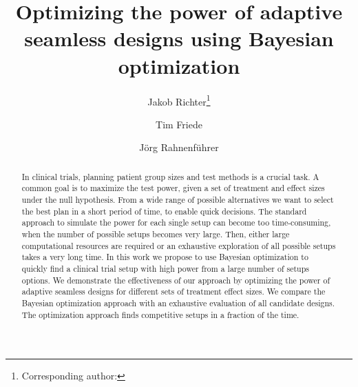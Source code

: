 \documentclass[bimj,fleqn]{w-art}
\theoremstyle{plain}
\theoremstyle{definition}
\begin{document}

\title[Bayesian optimization of Adaptive Seamless Designs]{Optimizing the power of adaptive seamless designs using Bayesian optimization} %
\author[Jakob Richter {\it{et al.}}]{Jakob Richter\footnote{Corresponding author: {}}} 
\address[\inst{1}]{Fakultät Statistik, Technische Universität Dortmund, 44221 Dortmund}
\author[dd]{Tim Friede}
\address[\inst{2}]{Institut für Medizinische Statistik, Universitätsmedizin Göttingen, 37073 Göttingen}
\author[]{Jörg Rahnenführer} %
   

\makeatletter
\let\newtitle\@title
\makeatother

\begin{abstract}
In clinical trials, planning patient group sizes and test methods is a crucial task.
A common goal is to maximize the test power, given a set of treatment and effect sizes under the null hypothesis.
From a wide range of possible alternatives we want to select the best plan in a short period of time, to enable quick decisions.
The standard approach to simulate the power for each single setup can become too time-consuming, when the number of possible setups becomes very large.
Then, either large computational resources are required or an exhaustive exploration of all possible setups takes a very long time.
In this work we propose to use Bayesian optimization to quickly find a clinical trial setup with high power from a large number of setups options.
We demonstrate the effectiveness of our approach by optimizing the power of adaptive seamless designs for different sets of treatment effect sizes.
We compare the Bayesian optimization approach with an exhaustive evaluation of all candidate designs.
The optimization approach finds competitive setups in a fraction of the time.
\end{abstract}
\end{document}
